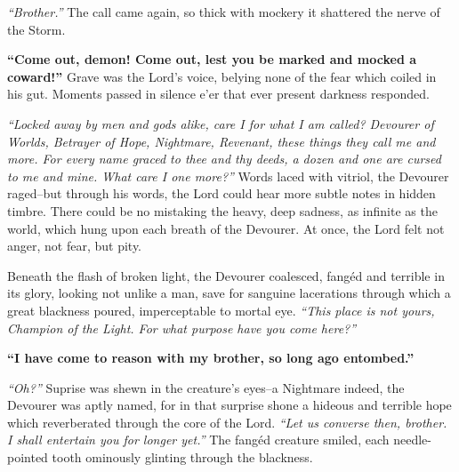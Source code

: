 \documentclass{report}
\begin{document}
\textit{``Brother.''} The call came again, so thick with mockery it shattered the nerve of the Storm.

\textbf{``Come out, demon! Come out, lest you be marked and mocked a coward!''} Grave was the Lord's voice, belying none of the fear which coiled in his gut. Moments passed in silence e'er that ever present darkness responded.

\textit{``Locked away by men and gods alike, care I for what I am called? Devourer of Worlds, Betrayer of Hope, Nightmare, Revenant, these things they call me and more. For every name graced to thee and thy deeds, a dozen and one are cursed to me and mine. What care I one more?''} Words laced with vitriol, the Devourer raged--but through his words, the Lord could hear more subtle notes in hidden timbre. There could be no mistaking the heavy, deep sadness, as infinite as the world, which hung upon each breath of the Devourer. At once, the Lord felt not anger, not fear, but pity.

Beneath the flash of broken light, the Devourer coalesced, fangéd and terrible in its glory, looking not unlike a man, save for sanguine lacerations through which a great blackness poured, imperceptable to mortal eye. \textit{``This place is not yours, Champion of the Light. For what purpose have you come here?''}

\textbf{``I have come to reason with my brother, so long ago entombed.''}

\textit{``Oh?''} Suprise was shewn in the creature's eyes--a Nightmare indeed, the Devourer was aptly named, for in that surprise shone a hideous and terrible hope which reverberated through the core of the Lord. \textit{``Let us converse then, brother. I shall entertain you for longer yet.''} The fangéd creature smiled, each needle-pointed tooth ominously glinting through the blackness.
\end{document}
